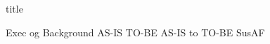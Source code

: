 \documentclass{article}
\begin{document}
{title}

\frontmatter

\tableofcontents


\mainmatter


{Exec og Background}
{AS-IS}
{TO-BE}
{AS-IS to TO-BE}
{SusAF}




\newpage
\printbibliography[heading = bibintoc, title = Bibliography]    %

\end{document}
